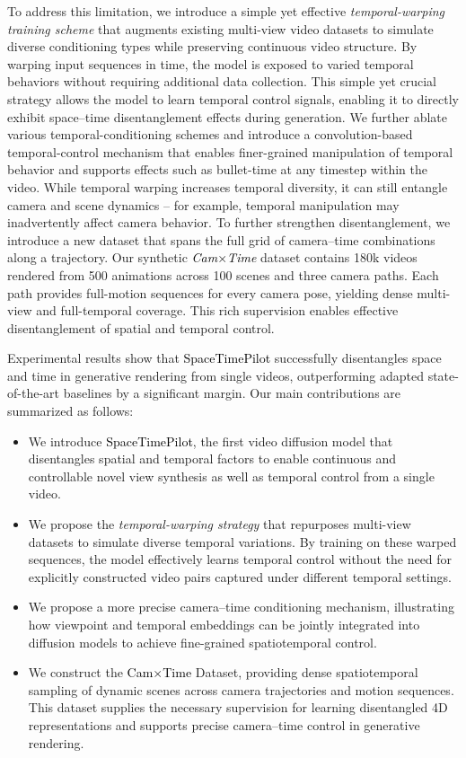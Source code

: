 \documentclass[10pt,twocolumn,letterpaper]{article}
\newcommand{\nameCOLOR}[1]{\textcolor{black}{#1}}
\newcommand{\nameMethod}{\nameCOLOR{\mbox{SpaceTimePilot}}\xspace}
\newcommand{\nameDataset}{\nameCOLOR{\mbox{Cam$\times$Time}}\xspace}
\begin{document}
To address this limitation, we introduce a simple yet effective \textit{temporal-warping training scheme} that augments existing multi-view video datasets \cite{Bai2025, bai2024syncammaster} to simulate diverse conditioning types while preserving continuous video structure. By warping input sequences in time, the model is exposed to varied temporal behaviors without requiring additional data collection. This simple yet crucial strategy allows the model to learn temporal control signals, enabling it to directly exhibit space–time disentanglement effects during generation.
We further ablate various temporal-conditioning schemes and introduce a convolution-based temporal-control mechanism that enables finer-grained manipulation of temporal behavior and supports effects such as bullet-time at any timestep within the video.
While temporal warping increases temporal diversity, it can still entangle camera and scene dynamics -- for example, temporal manipulation may inadvertently affect camera behavior. 
To further strengthen disentanglement, we introduce a new dataset that spans the full grid of camera–time combinations along a trajectory. Our synthetic \textit{\nameDataset} dataset contains 180k videos rendered from 500 animations across 100 scenes and three camera paths. Each path provides full-motion sequences for every camera pose, yielding dense multi-view and full-temporal coverage. This rich supervision enables effective disentanglement of spatial and temporal control.

Experimental results show that \nameMethod successfully disentangles space and time in generative rendering from single videos, outperforming adapted state-of-the-art baselines by a significant margin. 
Our main contributions are summarized as follows:
\begin{itemize}
\item	We introduce \nameMethod, the first video diffusion model that disentangles spatial and temporal factors to enable continuous and controllable novel view synthesis as well as temporal control from a single video.
\item  We propose the \textit{temporal-warping strategy} that repurposes multi-view datasets to simulate diverse temporal variations. By training on these warped sequences, the model effectively learns temporal control without the need for explicitly constructed video pairs captured under different temporal settings.
\item	We propose a more precise camera–time conditioning mechanism, illustrating how viewpoint and temporal embeddings can be jointly integrated into diffusion models to achieve fine-grained spatiotemporal control.
\item	We construct the \nameDataset Dataset, providing dense spatiotemporal sampling of dynamic scenes across camera trajectories and motion sequences. This dataset supplies the necessary supervision for learning disentangled 4D representations and supports precise camera–time control in generative rendering.
\end{itemize}
\end{document}
